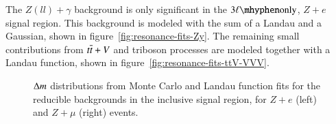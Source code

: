  The $Z(ll)+\gamma$ background is only significant in the $\threelo$, $Z+e$ signal region. This background is modeled with the sum of a Landau and a Gaussian, shown in figure~\ref{fig:resonance-fits-Zy}. The remaining small contributions from $t\overline{t}+V$ and triboson processes are modeled together with a Landau function, shown in figure~\ref{fig:resonance-fits-ttV-VVV}. 


\begin{figure}[htbp]
    \centering
	\caption{$\Delta m$ distributions from Monte Carlo and Landau function fits for the reducible backgrounds in the inclusive signal region, for $Z+e$ (left) and $Z+\mu$ (right) events.}
	\label{fig:reducible-landau-fits}
\end{figure}


